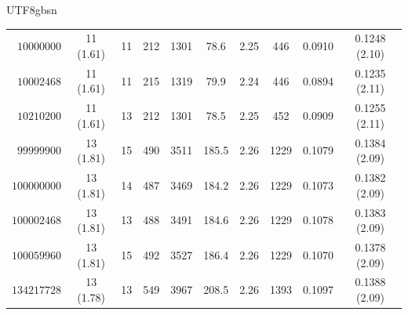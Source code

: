 \documentclass[11pt,a4paper]{article}
\theoremstyle{plain}
\theoremstyle{definition}
\begin{document}
\begin{CJK}{UTF8}{gbsn}
\begin{center}
\begin{tabular}{rcc|cccc|cc|c}
$10000000$ & 11 (1.61) & 11 & 212 & 1301 & 78.6 & 2.25 & 446 & 0.0910 & 0.1248 (2.10)\\
$10002468$ & 11 (1.61) & 11 & 215 & 1319 & 79.9 & 2.24 & 446 & 0.0894 & 0.1235 (2.11)\\
$10210200$ & 11 (1.61) & 13 & 212 & 1301 & 78.5 & 2.25 & 452 & 0.0909 & 0.1255 (2.11)\\
$99999900$ & 13 (1.81) & 15 & 490 & 3511 & 185.5 & 2.26 & 1229 & 0.1079 & 0.1384 (2.09)\\
$100000000$ & 13 (1.81) & 14 & 487 & 3469 & 184.2 & 2.26 & 1229 & 0.1073 & 0.1382 (2.09)\\
$100002468$ & 13 (1.81) & 13 & 488 & 3491 & 184.6 & 2.26 & 1229 & 0.1078 & 0.1383 (2.09)\\
$100059960$ & 13 (1.81) & 15 & 492 & 3527 & 186.4 & 2.26 & 1229 & 0.1070 & 0.1378 (2.09)\\
$134217728$ & 13 (1.78) & 13 & 549 & 3967 & 208.5 & 2.26 & 1393 & 0.1097 & 0.1388 (2.09)\\
\hline
\end{tabular}
\end{center}


\end{CJK}
\end{document}
